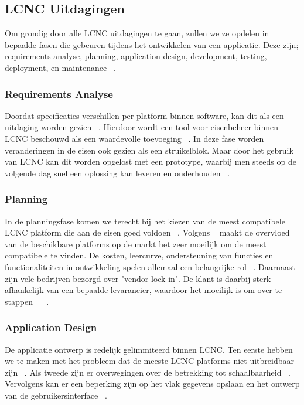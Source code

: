 \subsection*{LCNC Uitdagingen}
\label{sub:lcnc-uitdagingen}
Om grondig door alle LCNC uitdagingen te gaan, zullen we ze opdelen in bepaalde fasen
die gebeuren tijdens het ontwikkelen van een applicatie. 
Deze zijn; requirements analyse, planning, application design, development, testing, deployment, en maintenance ~\autocite{Rokis_2022}.
\subsubsection*{Requirements Analyse}
\label{sub:requirements-analyse}
Doordat specificaties verschillen per platform binnen software, kan dit als een uitdaging worden gezien ~\autocite{Rokis_2022}.
Hierdoor wordt een tool voor eisenbeheer binnen LCNC beschouwd als een waardevolle toevoeging ~\autocite{Rokis_2022}. 
In deze fase worden veranderingen in de eisen ook gezien als een struikelblok. Maar door het gebruik van LCNC kan dit worden opgelost 
met een prototype, waarbij men steeds op de volgende dag snel een oplossing kan leveren en onderhouden ~\autocite{Rokis_2022}.
\subsubsection*{Planning}
\label{sub:planning}
In de planningsfase komen we terecht bij het kiezen van de meest compatibele LCNC platform die aan de eisen goed voldoen ~\autocite{Rokis_2022}.
Volgens ~\textcite{Rokis_2022} maakt de overvloed van de beschikbare platforms op de markt het zeer moeilijk om de meest compatibele te vinden. De 
kosten, leercurve, ondersteuning van functies en functionaliteiten in ontwikkeling spelen allemaal een belangrijke rol ~\autocite{Rokis_2022}. Daarnaast zijn vele
bedrijven bezorgd over "vendor-lock-in". De klant is daarbij sterk afhankelijk van een bepaalde levarancier, waardoor het moeilijk is om over te stappen ~\autocite{Rokis_2022} ~\autocite{Yan2021}.
\subsubsection*{Application Design}
\label{sub:application-design}
De applicatie ontwerp is redelijk gelimmiteerd binnen LCNC.
Ten eerste hebben we te maken met het probleem dat de meeste LCNC platforms niet uitbreidbaar zijn ~\autocite{Rokis_2022}.
Als tweede zijn er overwegingen over de betrekking tot schaalbaarheid ~\autocite{Rokis_2022}. 
Vervolgens kan er een beperking zijn op het vlak gegevens opslaan en het ontwerp van de gebruikersinterface ~\autocite{Rokis_2022}.

